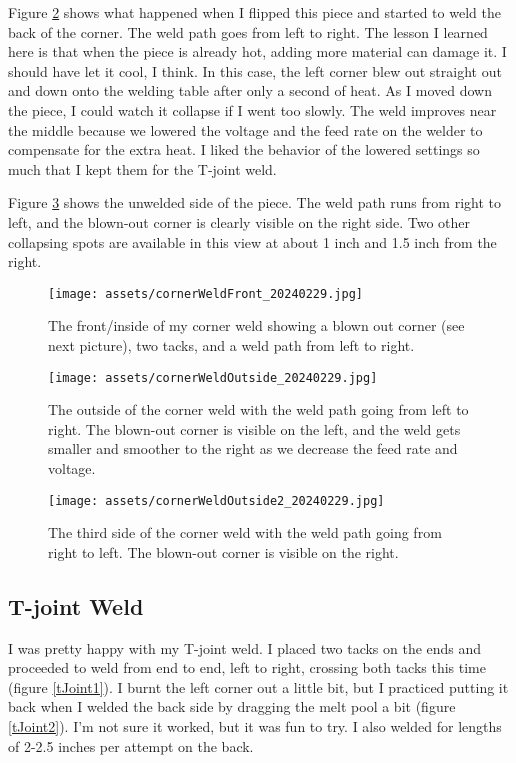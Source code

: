\documentclass{article}
\begin{document}
Figure \ref{corner2} shows what happened when I flipped this piece and started to weld the back of the corner. The weld path goes from left to right. The lesson I learned here is that when the piece is already hot, adding more material can damage it. I should have let it cool, I think. In this case, the left corner blew out straight out and down onto the welding table after only a second of heat. As I moved down the piece, I could watch it collapse if I went too slowly. The weld improves near the middle because we lowered the voltage and the feed rate on the welder to compensate for the extra heat. I liked the behavior of the lowered settings so much that I kept them for the T-joint weld.

Figure \ref{corner3} shows the unwelded side of the piece. The weld path runs from right to left, and the blown-out corner is clearly visible on the right side. Two other collapsing spots are available in this view at about 1 inch and 1.5 inch from the right.

\begin{figure}[h]
\caption{The front/inside of my corner weld showing a blown out corner (see next picture), two tacks, and a weld path from left to right.}
\texttt{[image: assets/cornerWeldFront\_20240229.jpg]}
\label{corner1}
\end{figure}

\begin{figure}[h]
\caption{The outside of the corner weld with the weld path going from left to right. The blown-out corner is visible on the left, and the weld gets smaller and smoother to the right as we decrease the feed rate and voltage.}
\texttt{[image: assets/cornerWeldOutside\_20240229.jpg]}
\label{corner2}
\end{figure}

\begin{figure}[h]
\caption{The third side of the corner weld with the weld path going from right to left. The blown-out corner is visible on the right.}
\texttt{[image: assets/cornerWeldOutside2\_20240229.jpg]}
\label{corner3}
\end{figure}

\subsection*{T-joint Weld}

I was pretty happy with my T-joint weld. I placed two tacks on the ends and proceeded to weld from end to end, left to right, crossing both tacks this time (figure \ref{tJoint1}). I burnt the left corner out a little bit, but I practiced putting it back when I welded the back side by dragging the melt pool a bit (figure \ref{tJoint2}). I'm not sure it worked, but it was fun to try. I also welded for lengths of 2-2.5 inches per attempt on the back.
\end{document}
